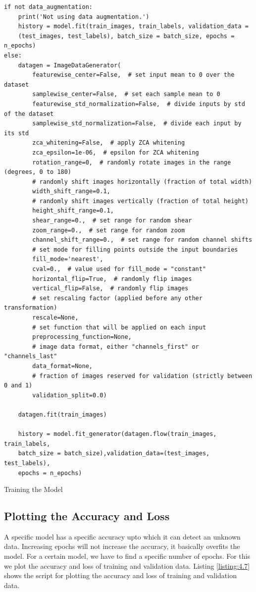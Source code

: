 \begin{longlisting}
    \begin{verbatim}
if not data_augmentation:
    print('Not using data augmentation.')
    history = model.fit(train_images, train_labels, validation_data =
    (test_images, test_labels), batch_size = batch_size, epochs = n_epochs)
else:
    datagen = ImageDataGenerator(
        featurewise_center=False,  # set input mean to 0 over the dataset
        samplewise_center=False,  # set each sample mean to 0
        featurewise_std_normalization=False,  # divide inputs by std of the dataset
        samplewise_std_normalization=False,  # divide each input by its std
        zca_whitening=False,  # apply ZCA whitening
        zca_epsilon=1e-06,  # epsilon for ZCA whitening
        rotation_range=0,  # randomly rotate images in the range (degrees, 0 to 180)
        # randomly shift images horizontally (fraction of total width)
        width_shift_range=0.1,
        # randomly shift images vertically (fraction of total height)
        height_shift_range=0.1,
        shear_range=0.,  # set range for random shear
        zoom_range=0.,  # set range for random zoom
        channel_shift_range=0.,  # set range for random channel shifts
        # set mode for filling points outside the input boundaries
        fill_mode='nearest',
        cval=0.,  # value used for fill_mode = "constant"
        horizontal_flip=True,  # randomly flip images
        vertical_flip=False,  # randomly flip images
        # set rescaling factor (applied before any other transformation)
        rescale=None,
        # set function that will be applied on each input
        preprocessing_function=None,
        # image data format, either "channels_first" or "channels_last"
        data_format=None,
        # fraction of images reserved for validation (strictly between 0 and 1)
        validation_split=0.0)
    
    datagen.fit(train_images)
    
    history = model.fit_generator(datagen.flow(train_images, train_labels,
    batch_size = batch_size),validation_data=(test_images, test_labels),
    epochs = n_epochs)    
    \end{verbatim}
    \caption{Training the Model}
\label{listing:4.6}
\end{longlisting}
\subsection{Plotting the Accuracy and Loss}
A specific model has a specific accuracy upto which it can detect an unknown data.
Increasing epochs will not increase the accuracy, it basically overfits
the model. For a certain model, we have to find a specific number
of epochs. For this we plot the accuracy and loss of training and
validation data. Listing \ref{listing:4.7} shows the script for plotting the accuracy and
loss of training and validation data.

